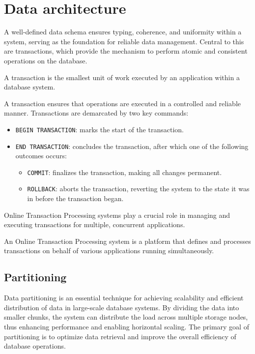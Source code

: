 \section{Data architecture}

A well-defined data schema ensures typing, coherence, and uniformity within a system, serving as the foundation for reliable data management. 
Central to this are transactions, which provide the mechanism to perform atomic and consistent operations on the database.
\begin{definition}
    A transaction is the smallest unit of work executed by an application within a database system. 
\end{definition}
\noindent A transaction ensures that operations are executed in a controlled and reliable manner.
Transactions are demarcated by two key commands:
\begin{itemize}
    \item \texttt{BEGIN TRANSACTION}: marks the start of the transaction.
    \item \texttt{END TRANSACTION}: concludes the transaction, after which one of the following outcomes occurs: 
        \begin{itemize}
            \item \texttt{COMMIT}: finalizes the transaction, making all changes permanent.
            \item \texttt{ROLLBACK}: aborts the transaction, reverting the system to the state it was in before the transaction began.
        \end{itemize}
\end{itemize}
\noindent Online Transaction Processing systems play a crucial role in managing and executing transactions for multiple, concurrent applications.
\begin{definition}
    An Online Transaction Processing system is a platform that defines and processes transactions on behalf of various applications running simultaneously.
\end{definition}

\subsection{Partitioning}
Data partitioning is an essential technique for achieving scalability and efficient distribution of data in large-scale database systems. 
By dividing the data into smaller chunks, the system can distribute the load across multiple storage nodes, thus enhancing performance and enabling horizontal scaling. 
The primary goal of partitioning is to optimize data retrieval and improve the overall efficiency of database operations.

